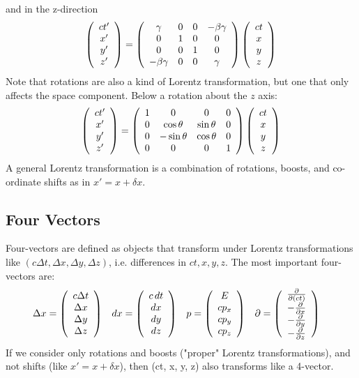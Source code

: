 and in the z-direction
\begin{equation}
 \left( \begin{array}{c} ct^{\prime} \\ x^{\prime} \\ y^{\prime} \\ z^{\prime}\end{array} \right)= 
      \left( \begin{array}{cccc} \gamma       &   0 & 0 & -\beta\gamma  \\ 
                                     0        &   1 & 0 & 0  \\
                                     0        &   0 & 1 & 0  \\
                                 -\beta\gamma &   0 & 0  & \gamma
             \end{array} \right) \left( \begin{array}{c} ct \\ x \\ y \\ z\end{array} \right) 
\end{equation}
Note that rotations are also a kind of Lorentz transformation, but one that only affects the space component. Below a rotation about the $z$ axis:
\begin{equation}
 \left( \begin{array}{c} ct^{\prime} \\ x^{\prime} \\ y^{\prime} \\ z^{\prime}\end{array} \right)= 
      \left( \begin{array}{cccc}      1     &  0 &  0  & 0  \\ 
                                0     &  \cos\theta  &  \sin\theta  & 0  \\
                                0     &  -\sin\theta & \cos\theta  & 0  \\
                                0     &    0         &  0  & 1
             \end{array} \right) \left( \begin{array}{c} ct \\ x \\ y \\ z\end{array} \right) 
\end{equation}
A general Lorentz transformation is a combination of rotations, boosts, and co-ordinate shifts as in $x' = x + \delta x$.

\subsection{Four Vectors}
Four-vectors are defined as objects that transform under Lorentz transformations like  $(c\mathit{\Delta t}, \mathit{\Delta x}, \mathit{\Delta y}, \mathit{\Delta z})$, i.e. differences in $ct, x, y, z$. The most important four-vectors are:
\begin{align}
  \Delta x &=  \left( \begin{array}{c} c\Delta t \\ \Delta x \\ \Delta y \\ \Delta z\end{array} \right)
& dx &=  \left( \begin{array}{c} c\,dt \\ dx \\ dy \\ dz\end{array} \right)
& p &=  \left( \begin{array}{c} E \\ cp_x \\ cp_y \\ cp_z\end{array} \right)
& \partial &=  \left( \begin{array}{c} \frac{\mathsf{\partial}}{\mathsf{\partial}(ct)} \\ -\frac{\mathsf{\partial}}{\mathsf{\partial}x} \\ -\frac{\mathsf{\partial}}{\mathsf{\partial}y} \\ -\frac{\mathsf{\partial}}{\mathsf{\partial}z}\end{array} \right)
\end{align}
If we consider only rotations and boosts ("proper" Lorentz transformations), and not shifts (like $x' = x + \delta x$), then (ct, x, y, z) also transforms like a 4-vector.

